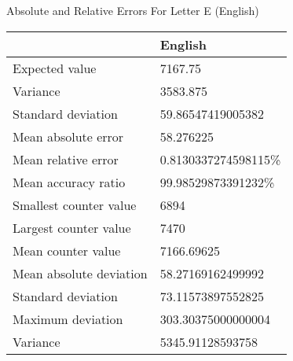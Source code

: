 \documentclass[]{revdetua}
\begin{document}
\begin{table}[!ht]
    \centering
     Absolute and Relative Errors For Letter E (English)\linebreak\linebreak
    \begin{tabular}{|l|l|}
    \hline
        ~ & English \\ \hline
        Expected value & 7167.75 \\ \hline
        Variance & 3583.875 \\ \hline
        Standard deviation & 59.86547419005382 \\ \hline
        Mean absolute error & 58.276225 \\ \hline
        Mean relative error & 0.8130337274598115\% \\ \hline
        Mean accuracy ratio & 99.98529873391232\% \\ \hline
        Smallest counter value & 6894 \\ \hline
        Largest counter value & 7470 \\ \hline
        Mean counter value & 7166.69625 \\ \hline
        Mean absolute deviation & 58.27169162499992 \\ \hline
        Standard deviation & 73.11573897552825 \\ \hline
        Maximum deviation & 303.30375000000004 \\ \hline
        Variance & 5345.91128593758 \\ \hline
    \end{tabular}
\end{table}
\end{document}
